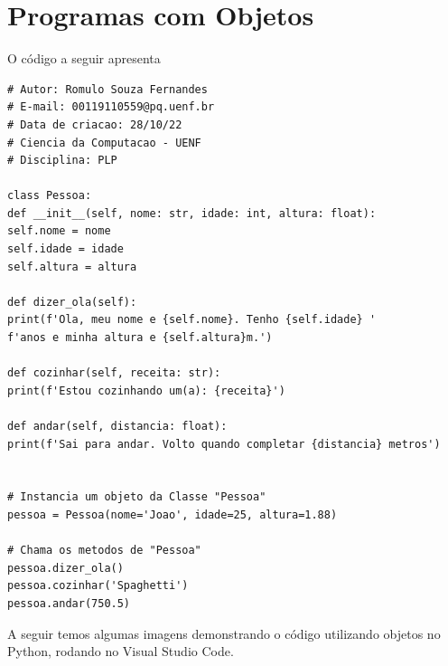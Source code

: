     \section{Programas com Objetos}
    O código a seguir apresenta
\begin{lstlisting}
# Autor: Romulo Souza Fernandes
# E-mail: 00119110559@pq.uenf.br
# Data de criacao: 28/10/22
# Ciencia da Computacao - UENF
# Disciplina: PLP

class Pessoa:
def __init__(self, nome: str, idade: int, altura: float):
self.nome = nome
self.idade = idade
self.altura = altura

def dizer_ola(self):
print(f'Ola, meu nome e {self.nome}. Tenho {self.idade} '
f'anos e minha altura e {self.altura}m.')

def cozinhar(self, receita: str):
print(f'Estou cozinhando um(a): {receita}')

def andar(self, distancia: float):
print(f'Sai para andar. Volto quando completar {distancia} metros')


# Instancia um objeto da Classe "Pessoa"
pessoa = Pessoa(nome='Joao', idade=25, altura=1.88)

# Chama os metodos de "Pessoa"
pessoa.dizer_ola()
pessoa.cozinhar('Spaghetti')
pessoa.andar(750.5)
\end{lstlisting}
	A seguir temos algumas imagens demonstrando o código utilizando objetos no Python, rodando no Visual Studio Code.
    
    
